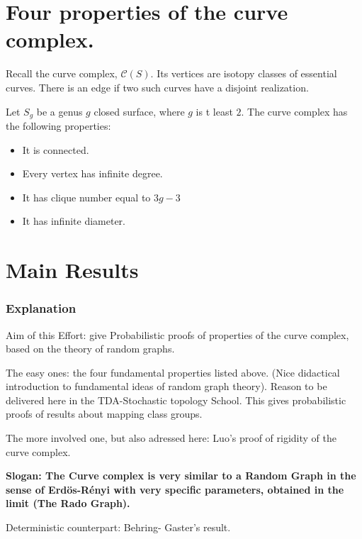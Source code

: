 \documentclass[handout]{beamer}
\theoremstyle{plain}
\begin{document}
\section{Four  properties  of the curve  complex.  }
\begin{frame}
Recall  the  curve  complex, $\mathcal{C}(S)$. Its   vertices  are   isotopy  classes  of  essential  curves. There  is  an  edge  if two  such  curves  have  a  disjoint  realization. 

 \begin{theorem}
Let  $S_g$ be  a  genus  $g$  closed  surface, where  $g$  is t  least $2$. 
The  curve  complex  has  the  following  properties: 
\begin{itemize}
\item  It  is  connected. 
\item Every  vertex  has  infinite degree. 
\item It  has  clique  number  equal  to $3g-3$
\item It  has infinite  diameter.  
\end{itemize}
\end{theorem}
\end{frame}


\section{Main Results}

\begin{frame}\frametitle{Explanation}

Aim  of  this  Effort:  give  Probabilistic  proofs  of properties of  the  curve complex, based  on the  theory  of  random graphs.  \pause 




The  easy  ones: the  four  fundamental  properties  listed above. (Nice  didactical  introduction  to  fundamental   ideas  of  random graph theory). \pause Reason to be delivered here  in the  TDA-Stochastic  topology  School. \pause   
This  gives  probabilistic  proofs  of   results  about  mapping  class  groups.  \pause 

\end{frame}

\begin{frame}

The more  involved  one, but also  adressed here: Luo's proof  of  rigidity  of  the  curve  complex.  \pause 
\end{frame}
\begin{frame}

\textbf{Slogan: The  Curve  complex  is   very  similar  to  a Random Graph  in the  sense  of  Erd\"os-R\'enyi  with  very  specific  parameters,  obtained  in the  limit (The  Rado Graph). \pause }

Deterministic  counterpart: Behring- Gaster's result. 

 




\end{frame}
\end{document}
